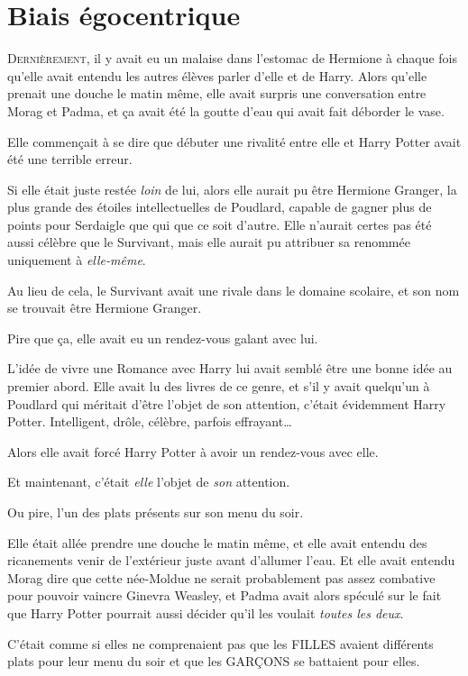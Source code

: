 \chapter{Biais égocentrique}

\lettrine{D}{ernièrement}, il y avait eu un malaise dans l'estomac de Hermione à chaque fois qu'elle avait entendu les autres élèves parler d'elle et de Harry.
Alors qu'elle prenait une douche le matin même, elle avait surpris une conversation entre Morag et Padma, et ça avait été la goutte d'eau qui avait fait déborder le vase.

Elle commençait à se dire que débuter une rivalité entre elle et Harry Potter avait été une terrible erreur.

Si elle était juste restée \emph{loin} de lui, alors elle aurait pu être Hermione Granger, la plus grande des étoiles intellectuelles de Poudlard, capable de gagner plus de points pour Serdaigle que qui que ce soit d'autre.
Elle n'aurait certes pas été aussi célèbre que le Survivant, mais elle aurait pu attribuer sa renommée uniquement à \emph{elle-même}.

Au lieu de cela, le Survivant avait une rivale dans le domaine scolaire, et son nom se trouvait être Hermione Granger.

Pire que ça, elle avait eu un rendez-vous galant avec lui.

L'idée de vivre une Romance avec Harry lui avait semblé être une bonne idée au premier abord.
Elle avait lu des livres de ce genre, et s'il y avait quelqu'un à Poudlard qui méritait d'être l'objet de son attention, c'était évidemment Harry Potter.
Intelligent, drôle, célèbre, parfois effrayant…

Alors elle avait forcé Harry Potter à avoir un rendez-vous avec elle.

Et maintenant, c'était \emph{elle} l'objet de \emph{son} attention.

Ou pire, l'un des plats présents sur son menu du soir.

Elle était allée prendre une douche le matin même, et elle avait entendu des ricanements venir de l'extérieur juste avant d'allumer l'eau.
Et elle avait entendu Morag dire que cette née-Moldue ne serait probablement pas assez combative pour pouvoir vaincre Ginevra Weasley, et Padma avait alors spéculé sur le fait que Harry Potter pourrait aussi décider qu'il les voulait \emph{toutes les deux}.

C'était comme si elles ne comprenaient pas que les FILLES avaient différents plats pour leur menu du soir et que les GARÇONS se battaient pour elles.

